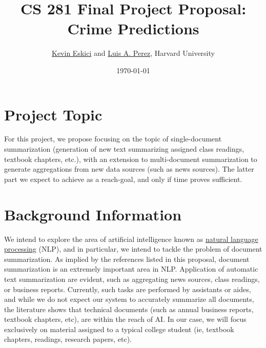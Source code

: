 \documentclass[10pt]{article}
\title{CS 281 Final Project Proposal: Crime Predictions}
\author{\href{mailto:keskici@college.harvard.edu}{Kevin Eskici} and \href{mailto:luisperez@college.harvard.edu}{Luis A. Perez}, Harvard University}
\date{\today}
\begin{document}
 \begin{center}
  \end{center}

\section{Project Topic}
For this project, we propose focusing on the topic of single-document summarization (generation of new text summarizing assigned class readings, textbook chapters, etc.), with an extension to multi-document summarization to generate aggregations from new data sources (such as news sources). The latter part we expect to achieve as a reach-goal, and only if time proves sufficient.

\section{Background Information}

 We intend to explore the area of artificial intelligence known as \href{https://en.wikipedia.org/wiki/Natural_language_processing}{natural language processing} (NLP), and in particular, we intend to tackle the problem of document summarization. As implied by the references listed in this proposal, document summarization is an extremely important area in NLP. Application of automatic text summarization are evident, such as aggregating news sources, class readings, or business reports. Currently, such tasks are performed by assistants or aides, and while we do not expect our system to accurately summarize all documents, the literature shows that technical documents (such as annual business reports, textbook chapters, etc), are within the reach of AI. In our case, we will focus exclusively on material assigned to a typical college student (ie, textbook chapters, readings, research papers, etc).
\end{document}
